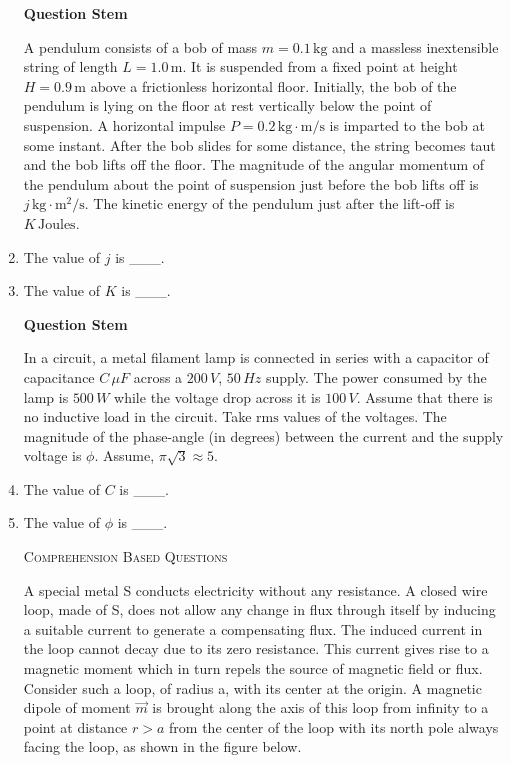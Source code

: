 \documentclass{article}
\begin{document}
\begin{enumerate}
\textbf{Question Stem}

    A pendulum consists of a bob of mass $m = 0.1 \, \text{kg}$ and a massless inextensible string of length $L = 1.0 \, \text{m}$. It is suspended from a fixed point at height $H = 0.9 \, \text{m}$ above a frictionless horizontal floor. Initially, the bob of the pendulum is lying on the floor at rest vertically below the point of suspension. A horizontal impulse $ P = 0.2 \, \text{kg}\cdot\text{m/s}$ is imparted to the bob at some instant. After the bob slides for some distance, the string becomes taut and the bob lifts off the floor. The magnitude of the angular momentum of the pendulum about the point of suspension just before the bob lifts off is $j \, \text{kg}\cdot\text{m}^2/\text{s}$. The kinetic energy of the pendulum just after the lift-off is $K \, \text{Joules}$.

    \item The value of $j$ is \_\_\_.
    \item The value of $K$ is \_\_\_.


\textbf{Question Stem}

    In a circuit, a metal filament lamp is connected in series with a capacitor of capacitance $C \, \mu F$ across a $200 \, V$, $50 \, Hz$ supply. The power consumed by the lamp is $500 \, W$ while the voltage drop across it is $100 \, V$. Assume that there is no inductive load in the circuit. Take $ \text{rms} $ values of the voltages. The magnitude of the phase-angle (in degrees) between the current and the supply voltage is $\phi$. Assume, $\pi\sqrt{3} \approx 5$.


    \item The value of $C$ is \_\_\_.
    \item The value of $\phi$ is \_\_\_.


\begin{center}
    \textsc{Comprehension Based Questions}
\end{center}

    A special metal S conducts electricity without any resistance. A closed wire loop, made of S, does not allow any change in flux through itself by inducing a suitable current to generate a compensating flux. The induced current in the loop cannot decay due to its zero resistance. This current gives rise to a magnetic moment which in turn repels the source of magnetic field or flux. Consider such a loop, of radius a, with its center at the origin. A magnetic dipole of moment $\vec{m}$ is brought along the axis of this loop from infinity to a point at distance $r>a$ from the center of the loop with its north pole always facing the loop, as shown in the figure below.
    

\end{enumerate}
\end{document}
